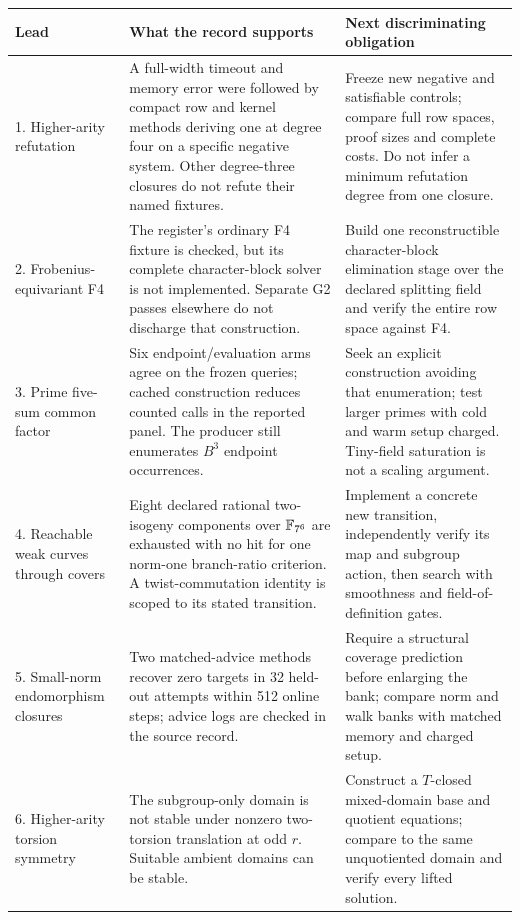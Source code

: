 \begin{longtable}{@{}p{3.1cm}p{5.5cm}p{4.8cm}@{}}\toprule
Lead & What the record supports & Next discriminating obligation \\\midrule\endhead
1. Higher-arity refutation & A full-width timeout and memory error were
followed by compact row and kernel methods deriving one at degree four
on a specific negative system. Other degree-three closures do not refute
their named fixtures. & Freeze new negative and satisfiable controls;
compare full row spaces, proof sizes and complete costs. Do not infer a
minimum refutation degree from one closure. \\
2. Frobenius-equivariant F4 & The register's ordinary F4 fixture is
checked, but its complete character-block solver is not implemented.
Separate G2 passes elsewhere do not discharge that construction. &
Build one reconstructible character-block elimination stage over the
declared splitting field and verify the entire row space against F4. \\
3. Prime five-sum common factor & Six endpoint/evaluation arms agree on
the frozen queries; cached construction reduces counted calls in the
reported panel. The producer still enumerates $B^3$ endpoint occurrences. &
Seek an explicit construction avoiding that enumeration; test larger
primes with cold and warm setup charged. Tiny-field saturation is not
a scaling argument. \\
4. Reachable weak curves through covers & Eight declared rational
two-isogeny components over $\mathbb F_{7^6}$ are exhausted with no hit for one
norm-one branch-ratio criterion. A twist-commutation identity is scoped
to its stated transition. & Implement a concrete new transition,
independently verify its map and subgroup action, then search with
smoothness and field-of-definition gates. \\
5. Small-norm endomorphism closures & Two matched-advice methods recover
zero targets in 32 held-out attempts within 512 online steps; advice
logs are checked in the source record. & Require a structural coverage
prediction before enlarging the bank; compare norm and walk banks with
matched memory and charged setup. \\
6. Higher-arity torsion symmetry & The subgroup-only domain is not
stable under nonzero two-torsion translation at odd $r$. Suitable ambient
domains can be stable. & Construct a $T$-closed mixed-domain base and
quotient equations; compare to the same unquotiented domain and verify
every lifted solution. \\

\end{longtable}
